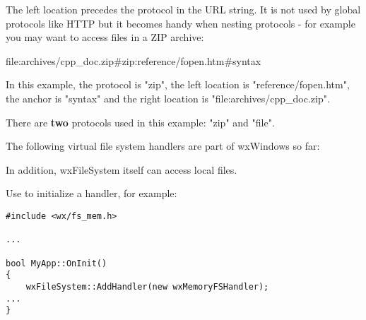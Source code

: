 
The left location precedes the protocol in the URL string. 
It is not used by global protocols like HTTP but it becomes handy when nesting
protocols - for example you may want to access files in a ZIP archive:

file:archives/cpp\_doc.zip\#zip:reference/fopen.htm\#syntax

In this example, the protocol is "zip", the left location is
"reference/fopen.htm", the anchor is "syntax" and the right location
is "file:archives/cpp\_doc.zip". 

There are {\bf two} protocols used in this example: "zip" and "file".


The following virtual file system handlers are part of wxWindows so far:

\begin{twocollist}
\end{twocollist}

In addition, wxFileSystem itself can access local files.



Use  to initialize
a handler, for example:

\begin{verbatim}
#include <wx/fs_mem.h>

...

bool MyApp::OnInit()
{
    wxFileSystem::AddHandler(new wxMemoryFSHandler);
...
}
\end{verbatim}

